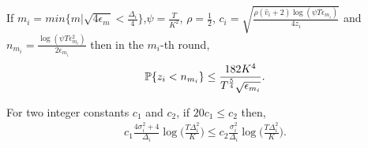 \begin{lemma}
\label{proofTheorem:Lemma:5}
If $m_i = min\lbrace m|\sqrt{4\epsilon_{m} } < \frac{\Delta_i}{4} \rbrace $,$\psi=\frac{T}{ K^2}$, $\rho=\frac{1}{2}$, $c_{i} =\sqrt{\frac{\rho (\hat{v}_i + 2)\log (\psi T\epsilon_{m_{i}})}{4 z_i}}$ and $n_{m_i}=\frac{\log{(\psi T\epsilon_{m_{i}}^{2})}}{2\epsilon_{m_{i}}}$ then in the $m_i$-th round, 
\begin{align*}
\mathbb{P}\lbrace z_i < n_{m_i} \rbrace  \leq \dfrac{182 K^4}{T^{\frac{5}{4}}\sqrt{\epsilon_{m_i}}}.
\end{align*}
\end{lemma}









\begin{lemma}
\label{proofTheorem:Lemma:6}
For two integer constants $c_1$ and $c_2$, if $20 c_1 \leq c_2$ then,
\begin{align*}
c_1 \frac{4\sigma_i^2 + 4}{\Delta_i}\log\bigg( \frac{T\Delta_i^2}{K}\bigg) \leq c_2 \frac{\sigma_i^2}{\Delta_i}\log\bigg( \frac{T\Delta_i^2}{K}\bigg).
\end{align*}
\end{lemma}


%
%


